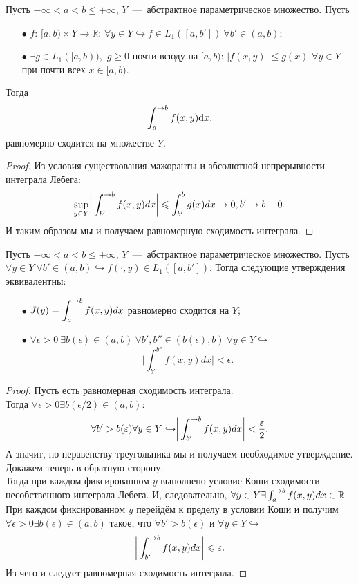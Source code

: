 \begin{theorem}
    Пусть $-\infty < a < b \leq +\infty$, $Y$~---~абстрактное параметрическое множество. Пусть
    \begin{enumerate}
        \item[$\bullet$] $f$: $[a, b) \times Y \to \mathbb{R}$: $\forall y \in Y \hookrightarrow f \in L_1 ([a, b']) \ \forall b' \in (a, b)$;
        \item[$\bullet$] $\exists g \in L_1 ([a, b)),$ $g \geq 0$ почти всюду на $[a, b)$: $|f(x, y)| \leq g(x)$ $\forall y \in Y$ при почти всех $x \in [a, b)$.
    \end{enumerate} 
    Тогда \[
              \int_a^{\rightarrow b} f(x, y) \text{d}x.
    \]
    равномерно сходится на множестве $Y$.
\end{theorem}
\begin{proof}
    Из условия существования мажоранты и абсолютной непрерывности интеграла Лебега:
    \[
        \sup\limits_{y \in Y} \biggr| \int_{b'}^{\rightarrow b} f(x, y)dx \biggr| \leqslant \int_{b'}^{b} g(x)dx \rightarrow 0, b' \rightarrow b - 0.
    \]
    И таким образом мы и получаем равномерную сходимость интеграла.
\end{proof}
\begin{theorem}
    Пусть $-\infty < a < b \leq +\infty$, $Y$~---~абстрактное параметрическое множество. Пусть $\forall y \in Y \ \forall b' \in (a, b) \hookrightarrow f(\cdot, y) \in L_1([a, b'])$.
    Тогда следующие утверждения эквивалентны:
    \begin{enumerate}
        \item[$\bullet$] $\displaystyle J(y) = \int_a^{\rightarrow b} f(x, y)dx$ равномерно сходится на $Y$;
        \item[$\bullet$] $\forall \epsilon > 0 \ \exists b(\epsilon) \in (a, b) \ \forall b', b'' \in (b(\epsilon), b) \ \forall y \in Y \hookrightarrow$
        \[
            \biggr|\int_{b'}^{b''} f(x, y)dx \biggr| < \epsilon.
        \]
    \end{enumerate}
\end{theorem}
\begin{proof}
    Пусть есть равномерная сходимость интеграла. \\
    Тогда $\forall \epsilon > 0 \exists b(\epsilon/2) \in (a, b)$:
    \[
        \forall b' > b(\varepsilon) \forall y \in Y \hookrightarrow \biggr|\int_{b'}^{\rightarrow b}f(x, y)dx \biggr| < \dfrac{\varepsilon}{2}.
    \]
    А значит, по неравенству треугольника мы и получаем необходимое утверждение. \\
    Докажем теперь в обратную сторону. \\
    Тогда при каждом фиксированном $y$ выполнено условие Коши сходимости несобственного интеграла Лебега.
    И, следовательно, $\forall y \in Y \exists \int_{a}^{\rightarrow b} f(x, y)dx \in \mathbb{R}$ .
    При каждом фиксированном $y$ перейдём к пределу в условии Коши и получим $\forall \epsilon > 0 \exists b(\epsilon) \in (a, b)$ такое, что $\forall b' > b(\epsilon)$ и $\forall y \in Y \hookrightarrow$
    \[
        \biggr| \int_{b'}^{\rightarrow b}f(x, y)dx \biggr| \leqslant \varepsilon.
    \]
    Из чего и следует равномерная сходимость интеграла.
\end{proof}


